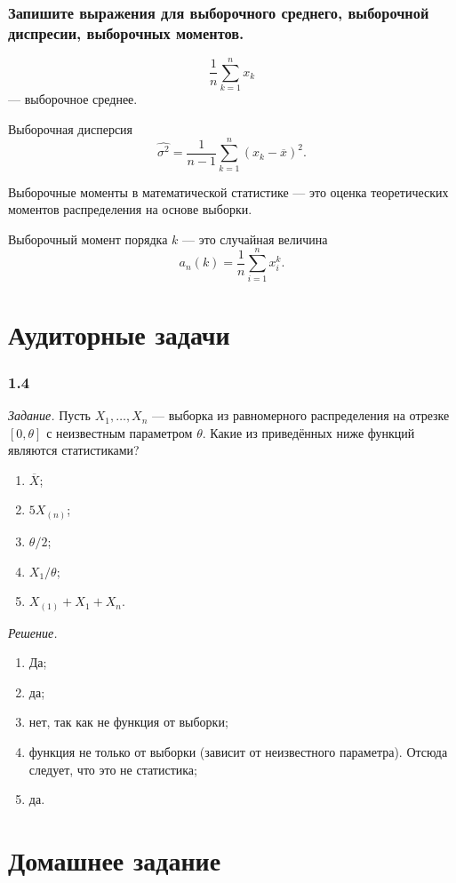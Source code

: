 \subsubsection*{Запишите выражения для выборочного среднего, выборочной диспресии,
                выборочных моментов.}

$$ \frac{1}{n} \sum \limits_{k = 1}^n x_k$$
--- выборочное среднее.

Выборочная дисперсия
$$ \hat{ \sigma^2} =
  \frac{1}{n - 1} \sum \limits_{k = 1}^n \left( x_k - \overline{x} \right)^2.$$

Выборочные моменты в математической статистике ---
это оценка теоретических моментов распределения на основе выборки.

Выборочный момент порядка $k$ --- это случайная величина
$$a_n \left( k \right) =
   \frac{1}{n} \sum \limits_{i = 1}^n x_i^k.$$

\section*{Аудиторные задачи}

\subsubsection{1.4}

\textit{Задание.}
Пусть $X_1, \dotsc, X_n$ ---
выборка из равномерного распределения на отрезке $ \left[0, \theta \right] $
с неизвестным параметром $ \theta $.
Какие из приведённых ниже функций являются статистиками?
\begin{enumerate}[label=\alph*)]
  \item $ \overline{X}$;
  \item $5X_{ \left( n \right) }$;
  \item $ \theta / 2$;
  \item $X_1 / \theta $;
  \item $X_{ \left( 1 \right) } + X_1 + X_n$.
\end{enumerate}

\textit{Решение.}
\begin{enumerate}[label=\alph*)]
  \item Да;
  \item да;
  \item нет, так как не функция от выборки;
  \item функция не только от выборки (зависит от неизвестного параметра).
  Отсюда следует, что это не статистика;
  \item да.
\end{enumerate}

\section*{Домашнее задание}
